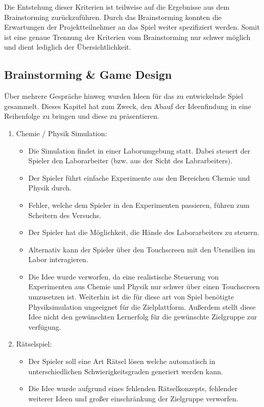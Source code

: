 	Die Entstehung dieser Kriterien ist teilweise auf die Ergebnisse aus dem Brainstorming zurückzuführen. Durch das Brainstorming konnten die Erwartungen der Projektteilnehmer an das Spiel weiter spezifiziert werden. Somit ist eine genaue Trennung der Kriterien vom Brainstorming nur schwer möglich und dient lediglich der Übersichtlichkeit.

\subsection{Brainstorming \& Game Design}\label{ssec:idee}
	Über mehrere Gespräche hinweg wurden Ideen für das zu entwickelnde Spiel gesammelt. Dieses Kapitel hat zum Zweck, den Abauf der Ideenfindung in eine Reihenfolge zu bringen und diese zu präsentieren.
	\begin{enumerate}
		\item{Chemie / Physik Simulation:}
		\begin{itemize}
			\item{Die Simulation findet in einer Laborumgebung statt. Dabei steuert der Spieler den Laborarbeiter (bzw. aus der Sicht des Labrarbeiters).}
			\item{Der Spieler führt einfache Experimente aus den Bereichen Chemie und Physik durch.}
			\item{Fehler, welche dem Spieler in den Experimenten passieren, führen zum Scheitern des Versuchs.}
			\item{Der Spieler hat die Möglichkeit, die Hände des Laborarbeiters zu steuern.}
			\item{Alternativ kann der Spieler über den Touchscreen mit den Utensilien im Labor interagieren.}
			\item{Die Idee wurde verworfen, da eine realistische Steuerung von Experimenten aus Chemie und Physik nur schwer über einen Touchscreen umzusetzen ist. Weiterhin ist die für diese art von Spiel benötigte Physiksimulation ungeeignet für die Zielplattform. Außerdem stellt diese Idee nicht den gewünschten Lernerfolg für die gewünschte Zielgruppe zur verfügung. }
		\end{itemize}
		\item{Rätselspiel:}
		\begin{itemize}
			\item{Der Spieler soll eine Art Rätsel lösen welche automatisch in unterschiedlichen Schwierigkeitsgraden generiert werden kann.}
			\item{Die Idee wurde aufgrund eines fehlenden Rätselkonzepts, fehlender weiterer Ideen und großer einschränkung der Zielgruppe verworfen.}

\end{itemize}
\end{enumerate}
